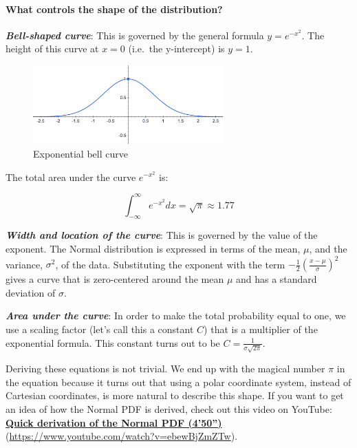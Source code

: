 \documentclass[
]{article}
\begin{document}
\hypertarget{what-controls-the-shape-of-the-distribution}{%
\paragraph{What controls the shape of the
distribution?}\label{what-controls-the-shape-of-the-distribution}}

\textbf{\emph{Bell-shaped curve}}: This is governed by the general
formula \(y = e^{-x^2}\). The height of this curve at \(x = 0\)
(i.e.~the y-intercept) is \(y = 1\).

\begin{figure}
\centering
\includegraphics[width=0.65\textwidth,height=\textheight]{Images/Exponential_Bell_Curve.png}
\caption{Exponential bell curve}
\end{figure}

The total area under the curve \(e^{-x^2}\) is:

\[ \int_{-\infty}^{\infty}e^{-x^2}dx = \sqrt{\pi} \approx 1.77\]

\textbf{\emph{Width and location of the curve}}: This is governed by the
value of the exponent. The Normal distribution is expressed in terms of
the mean, \(\mu\), and the variance, \(\sigma^2\), of the data.
Substituting the exponent with the term
\({-\frac{1}{2}\left(\frac{x-\mu}{\sigma}\right)^2}\) gives a curve that
is zero-centered around the mean \(\mu\) and has a standard deviation of
\(\sigma\).

\textbf{\emph{Area under the curve}}: In order to make the total
probability equal to one, we use a scaling factor (let's call this a
constant \(C\)) that is a multiplier of the exponential formula. This
constant turns out to be \(C = \frac{1}{\sigma\sqrt{2\pi}}\).

Deriving these equations is not trivial. We end up with the magical
number \(\pi\) in the equation because it turns out that using a polar
coordinate system, instead of Cartesian coordinates, is more natural to
describe this shape. If you want to get an idea of how the Normal PDF is
derived, check out this video on YouTube:
\href{https://www.youtube.com/watch?v=ebewBjZmZTw}{\textbf{Quick
derivation of the Normal PDF (4'50'')}}
(\url{https://www.youtube.com/watch?v=ebewBjZmZTw}).
\end{document}
